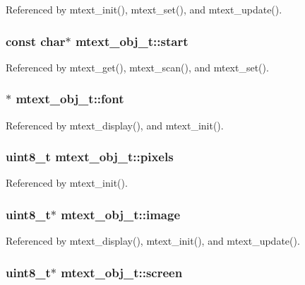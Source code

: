 Referenced by mtext\_\-init(), mtext\_\-set(), and mtext\_\-update().\hypertarget{structmtext__obj__t_17ae4a793386ebac51ba76800812327d}{
\subsubsection{\setlength{\rightskip}{0pt plus 5cm}const char$\ast$ {\bf mtext\_\-obj\_\-t::start}}}
\label{structmtext__obj__t_17ae4a793386ebac51ba76800812327d}




Referenced by mtext\_\-get(), mtext\_\-scan(), and mtext\_\-set().\hypertarget{structmtext__obj__t_9c8d6b873815f4b460c8e08b339c6814}{
\subsubsection{$\ast$ {\bf mtext\_\-obj\_\-t::font}}}
\label{structmtext__obj__t_9c8d6b873815f4b460c8e08b339c6814}




Referenced by mtext\_\-display(), and mtext\_\-init().\hypertarget{structmtext__obj__t_3952a63b6d568b8e6c096c6b51fb8fd6}{
\subsubsection{\setlength{\rightskip}{0pt plus 5cm}uint8\_\-t {\bf mtext\_\-obj\_\-t::pixels}}}
\label{structmtext__obj__t_3952a63b6d568b8e6c096c6b51fb8fd6}




Referenced by mtext\_\-init().\hypertarget{structmtext__obj__t_63674b367a060ae8a03560115b7faf0c}{
\subsubsection{\setlength{\rightskip}{0pt plus 5cm}uint8\_\-t$\ast$ {\bf mtext\_\-obj\_\-t::image}}}
\label{structmtext__obj__t_63674b367a060ae8a03560115b7faf0c}




Referenced by mtext\_\-display(), mtext\_\-init(), and mtext\_\-update().\hypertarget{structmtext__obj__t_5e65a906c4a26f7b8456a12fd67616c6}{
\subsubsection{\setlength{\rightskip}{0pt plus 5cm}uint8\_\-t$\ast$ {\bf mtext\_\-obj\_\-t::screen}}}
\label{structmtext__obj__t_5e65a906c4a26f7b8456a12fd67616c6}





